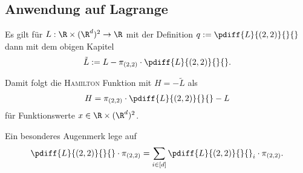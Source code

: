 \documentclass[../WiSe22ANA3.tex]{subfiles}
\begin{document}
			\subsection{Anwendung auf Lagrange}
				Es gilt für $L:\R\times(\R^d)^2\to\R$ mit der Definition $q:=\pdiff{L}{(2,2)}{}{}$ dann mit dem obigen Kapitel 
				\begin{align*}
					\tilde L:=L-\pi_{(2,2)}\cdot\pdiff{L}{(2,2)}{}{}.
				\end{align*}
				\begin{info}
					Damit folgt die \textsc{Hamilton} Funktion mit $H=-\tilde L$ als
					\begin{align*}
						H=\pi_{(2,2)}\cdot\pdiff{L}{(2,2)}{}{}-L
					\end{align*}
					für Funktionswerte $x\in\R\times(\R^d)^2$. 
				\end{info}
				Ein besonderes Augenmerk lege auf
				\begin{align*}
					\pdiff{L}{(2,2)}{}{}\cdot \pi_{(2,2)}=\sum_{i\in[d]}\pdiff{L}{(2,2)}{}{}_i\cdot \pi_{(2,2)}.
				\end{align*}
\end{document}
